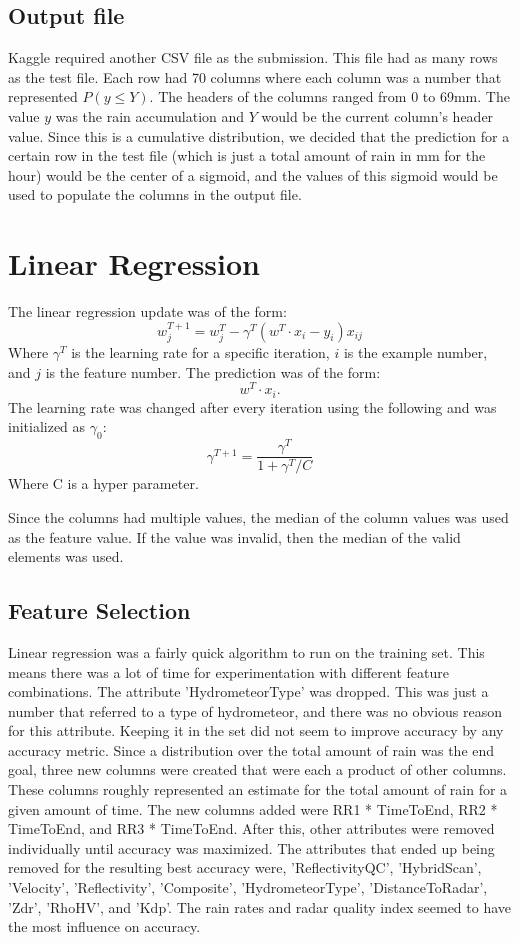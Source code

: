 ﻿\documentclass[pdftex,a4paper,12pt]{article}
\begin{document}
\subsection{Output file}
Kaggle required another CSV file as the submission. This file had as many rows as the test file. Each row had 70 columns where each column was a number that represented $P(y \le Y)$. The headers of the columns ranged from 0 to 69mm. The value $y$ was the rain accumulation and $Y$ would be the current column's header value. Since this is a cumulative distribution, we decided that the prediction for a certain row in the test file (which is just a total amount of rain in mm for the hour) would be the center of a sigmoid, and the values of this sigmoid would be used to populate the columns in the output file.




\section{Linear Regression}
The linear regression update was of the form:
$$w^{T + 1}_j = w^{T}_j - \gamma^T(w^{T} \cdot x_{i} - y_i)x_{ij}$$
Where $\gamma^T$ is the learning rate for a specific iteration, $i$ is the example number, and $j$ is the feature number. The prediction was of the form:
$$w^{T} \cdot x_{i}.$$
The learning rate was changed after every iteration using the following and was initialized as $\gamma_0$:
$$\gamma^{T + 1} = \frac{\gamma^{T}}{1 + \gamma^{T} / C}$$
Where C is a hyper parameter.




Since the columns had multiple values, the median of the column values was used as the feature value. If the value was invalid, then the median of the valid elements was used.
\subsection{Feature Selection}
Linear regression was a fairly quick algorithm to run on the training set. This means there was a lot of time for experimentation with different feature combinations. The attribute 'HydrometeorType' was dropped. This was just a number that referred to a type of hydrometeor, and there was no obvious reason for this attribute. Keeping it in the set did not seem to improve accuracy by any accuracy metric. Since a distribution over the total amount of rain was the end goal, three new columns were created that were each a product of other columns. These columns roughly represented an estimate for the total amount of rain for a given amount of time. The new columns added were RR1 * TimeToEnd, RR2 * TimeToEnd, and RR3 * TimeToEnd. After this, other attributes were removed individually until accuracy was maximized. The attributes that ended up being removed for the resulting best accuracy were, 'ReflectivityQC', 'HybridScan', 'Velocity', 'Reflectivity', 'Composite', 'HydrometeorType', 'DistanceToRadar', 'Zdr', 'RhoHV', and 'Kdp'. The rain rates and radar quality index seemed to have the most influence on accuracy.
\end{document}
